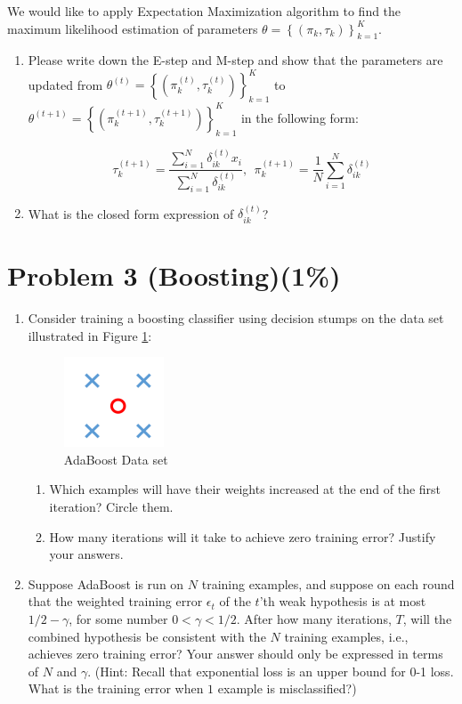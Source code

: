 \documentclass{article}
\begin{document}
We would like to apply Expectation Maximization algorithm to find the
maximum likelihood estimation of parameters
\(\theta = \left\{ (\pi_{k},\tau_{k}) \right\}_{k = 1}^{K}\).
\begin{enumerate}[label=(\alph*)]
\item
   Please write down the E-step and M-step and show
  that the parameters are updated from
  \(\theta^{(t)} = \left\{ (\pi_{k}^{(t)},\tau_{k}^{(t)}) \right\}_{k = 1}^{K}\)
  to
  \(\theta^{(t + 1)} = \left\{ (\pi_{k}^{(t + 1)},\tau_{k}^{(t + 1)}) \right\}_{k = 1}^{K}\)
  in the following form:

\[\tau_{k}^{(t + 1)} = \frac{\sum_{i = 1}^{N}{\delta_{ik}^{(t)}x_{i}}}{\sum_{i = 1}^{N}\delta_{ik}^{(t)}},\ \ \pi_{k}^{(t + 1)} = \frac{1}{N}\sum_{i = 1}^{N}\delta_{ik}^{(t)}\]

\item
  What is the closed form expression of
  \(\delta_{ik}^{(t)}\)?
\end{enumerate}


\section*{Problem 3 (Boosting)(1\%)}
\begin{enumerate}
\item  Consider training a boosting classifier using decision stumps on the data set illustrated in Figure \ref{fig:adaboost_toy_example}:
	\begin{figure}[H]
	\centerline{\includegraphics[width = 2 cm, height = 2 cm]{adaboost_toy_example.png}}
	\caption{
	AdaBoost Data set
	}
	\label{fig:adaboost_toy_example}
	\end{figure} 
	\begin{enumerate}
	\item Which examples will have their weights increased at the end of the first iteration? Circle them.
	\item  How many iterations will it take to achieve zero training error? Justify your answers.
	\end{enumerate}
\item  Suppose AdaBoost is run on $N$ training examples, and suppose on each round that the weighted training error $\epsilon_t$ of the $t$'th weak hypothesis is at most $1/2-\gamma$, for some number $0 < \gamma < 1/2$. After how many iterations, $T$, will the combined hypothesis be consistent with the $N$ training examples, i.e., achieves zero training error? Your answer should only be expressed in terms of $N$ and $\gamma$. (Hint: Recall that exponential loss is an upper bound for 0-1 loss. What is the training error when $1$ example is misclassified?)
\end{enumerate}
\end{document}
